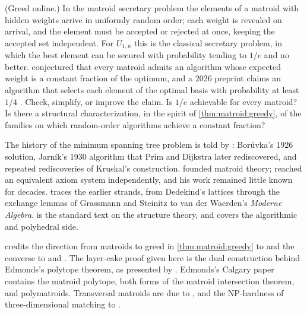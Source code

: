 \begin{refsection}
\begin{exercises}
\item \research\label{ex:matroid:research-secretary} (Greed online.) In the matroid secretary problem the elements of a matroid with hidden weights arrive in uniformly random order; each weight is revealed on arrival, and the element must be accepted or rejected at once, keeping the accepted set independent. For $U_{1,n}$ this is the classical secretary problem, in which the best element can be secured with probability tending to $1/e$ and no better. \textcite{BabaioffImmorlicaKleinberg2007} conjectured that every matroid admits an algorithm whose expected weight is a constant fraction of the optimum, and a 2026 preprint claims an algorithm that selects each element of the optimal basis with probability at least $1/4$ \parencite{Singla2026}. Check, simplify, or improve the claim. Is $1/e$ achievable for every matroid? Is there a structural characterization, in the spirit of \cref{thm:matroid:greedy}, of the families on which random-order algorithms achieve a constant fraction?
\end{exercises}

\notesandrefs

The history of the minimum spanning tree problem is told by \textcite{GrahamHell1985}: Bor\r{u}vka's 1926 solution, Jarn\'ik's 1930 algorithm that Prim and Dijkstra later rediscovered, and repeated rediscoveries of Kruskal's construction. \textcite{Whitney1935} founded matroid theory; \textcite{Nakasawa1935} reached an equivalent axiom system independently, and his work remained little known for decades. \textcite[Section~39.10b]{Schrijver2003} traces the earlier strands, from Dedekind's lattices through the exchange lemmas of Grassmann and Steinitz to van der Waerden's \emph{Moderne Algebra}. \textcite{Oxley2011} is the standard text on the structure theory, and \textcite[Chapters~39--44]{Schrijver2003} covers the algorithmic and polyhedral side.

\textcite[Section~40.1]{Schrijver2003} credits the direction from matroids to greed in \cref{thm:matroid:greedy} to \textcite{Rado1957} and the converse to \textcite{Gale1968} and \textcite{Edmonds1971}. The layer-cake proof given here is the dual construction behind Edmonds's polytope theorem, as presented by \textcite[Theorem~40.2]{Schrijver2003}. Edmonds's Calgary paper \parencite{Edmonds1970} contains the matroid polytope, both forms of the matroid intersection theorem, and polymatroids. Transversal matroids are due to \textcite{EdmondsFulkerson1965}, and the NP-hardness of three-dimensional matching to \textcite{Karp1972}.


\end{refsection}
